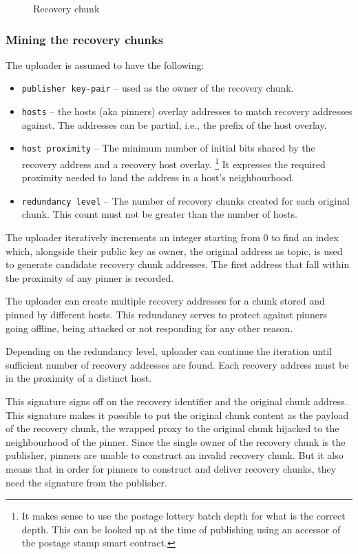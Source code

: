 \begin{figure}[htbp]
  \centering
  \caption[Recovery chunk \statusred]{Recovery chunk}
  \label{fig:recovery-chunk}
\end{figure}

\subsubsection{Mining the recovery chunks}


The uploader is assumed to have the following:

\begin{itemize}
\item \lstinline{publisher key-pair} -- used as the owner of the recovery chunk.
\item \lstinline{hosts} -- the hosts (aka pinners) overlay addresses to match recovery addresses against. The addresses can be partial, i.e., the prefix of the host overlay. 
\item \lstinline{host proximity} -- The minimum number of initial bits shared by the recovery address and a recovery host overlay.%
%
\footnote{It makes sense to use the postage lottery batch depth for what is the correct depth. This can be looked up at the time of publishing using an accessor of the postage stamp smart contract.}
%
It expresses the required proximity needed to land the address in a host's neighbourhood. 
\item \lstinline{redundancy level} -- The number of recovery chunks created for each original chunk. This count must not be greater than the number of hosts.
\end{itemize}

The uploader iteratively increments an integer starting from 0 to find an index which, alongside their public key as  owner, the original address as topic, is used to generate candidate recovery chunk addresses. 
The first address that fall within the proximity of any pinner is recorded.

The uploader can create multiple recovery addresses for a chunk stored and pinned by different hosts. This redundancy serves to protect against pinners going offline, being attacked or not responding for any other reason.

Depending on the redundancy level, uploader can continue the iteration until sufficient number of recovery addresses are found. Each recovery address must be in the proximity of a distinct host.


This signature signs off on the recovery identifier and the original chunk address. This signature makes it possible to put the original chunk content as the payload of the recovery chunk, the wrapped proxy to the original chunk hijacked to the neighbourhood of the pinner. Since the single owner of the recovery chunk is the publisher, pinners are unable to construct an invalid recovery chunk.
But it also means that in order for pinners to construct and deliver recovery chunks, they need the signature from the publisher. 
 


